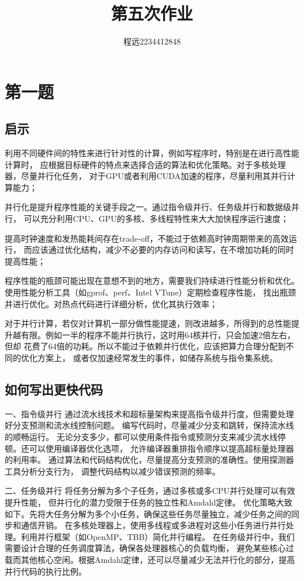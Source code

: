 \documentclass[UTF8]{ctexart}
\begin{document}
\title{\vspace{0cm}第五次作业}
\author{程远2234412848}
\date{}
\maketitle

\section{第一题}
\subsection{启示}
利用不同硬件间的特性来进行针对性的计算，例如写程序时，特别是在进行高性能计算时，
应根据目标硬件的特点来选择合适的算法和优化策略。对于多核处理器，尽量并行化任务，
对于GPU或者利用CUDA加速的程序，尽量利用其并行计算能力；

并行化是提升程序性能的关键手段之一。通过指令级并行、任务级并行和数据级并行，
可以充分利用CPU、GPU的多核、多线程特性来大大加快程序运行速度；

提高时钟速度和发热能耗间存在trade-off，不能过于依赖高时钟周期带来的高效运行，
而应该通过优化结构，减少不必要的内存访问和读写，在不增加功耗的同时提高性能；

程序性能的瓶颈可能出现在意想不到的地方，需要我们持续进行性能分析和优化。
使用性能分析工具（如gprof、perf、Intel VTune）定期检查程序性能，
找出瓶颈并进行优化。对热点代码进行详细分析，优化其执行效率；

对于并行计算，若仅对计算机一部分做性能提速，则改进越多，所得到的总性能提
升越有限。例如一半的程序不能并行执行，这时用64核并行，只会加速2倍左右，但却
花费了64倍的功耗。所以不能过于依赖并行优化，应该把算力合理分配到不同的优化方案上，
或者仅加速经常发生的事件，如储存系统与指令集系统。

\subsection{如何写出更快代码}
一、指令级并行
通过流水线技术和超标量架构来提高指令级并行度，但需要处理好分支预测和流水线控制问题。
编写代码时，尽量减少分支和跳转，保持流水线的顺畅运行。
无论分支多少，都可以使用条件指令或预测分支来减少流水线停顿。还可以使用编译器优化选项，
允许编译器重排指令顺序以提高超标量处理器的利用率。
通过算法和代码结构优化，尽量提高分支预测的准确性。使用探测器工具分析分支行为，
调整代码结构以减少错误预测的频率。

二、任务级并行
将任务分解为多个子任务，通过多核或多CPU并行处理可以有效提升性能，
但并行化的潜力受限于任务的独立性和Amdahl定律。
优化策略大致如下。先将大任务分解为多个小任务，确保这些任务尽量独立，减少任务之间的同步和通信开销。
在多核处理器上，使用多线程或多进程对这些小任务进行并行处理。利用并行框架（如OpenMP、TBB）简化并行编程。
在任务级并行中，我们需要设计合理的任务调度算法，确保各处理器核心的负载均衡，
避免某些核心过载而其他核心空闲。根据Amdahl定律，还可以尽量减少无法并行化的部分，提高并行代码的执行比例。
\end{document}
